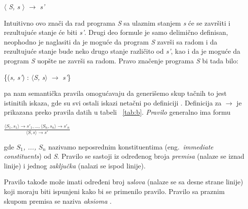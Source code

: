\documentclass[a4paper]{article}
\begin{document}
{\begin{center}$\langle$ \textit{S, s} $\rangle$ $\rightarrow$ \textit{s'} \end{center}
Intuitivno ovo znači da rad programa \textit{S} sa ulaznim stanjem \textit{s} će se završiti i rezultujuće stanje će biti \textit{s'}. Drugi deo formule je samo delimično definisan, neophodno je naglasiti da je moguće da program \textit{S} završi sa radom i da rezultujuće stanje bude neko drugo stanje različito od \textit{s'}, kao i da je moguće da program \textit{S} uopšte ne završi sa radom. Pravo značenje programa \textit{S} bi tada bilo:
\begin{center}\{(\textit{s, s'}) : $\langle$\textit{S, s}$\rangle$ $\rightarrow$ \textit{s'}\} \end{center} 
pa nam semantička pravila omogućavaju da generišemo skup tačnih to jest istinitih iskaza, gde su svi ostali iskazi netačni po definiciji \cite{wiley}.
Definicija za $\rightarrow$ je prikazana preko pravila datih u tabeli ~\ref{tab:b}. \textit{Pravilo} generalno ima formu

{\large \begin{center}$\frac{\langle S_1, s_1 \rangle \rightarrow s'_1, ... , \langle S_n, s_n \rangle \rightarrow s'_n}{\langle S, s \rangle \rightarrow s'}$ \end{center}}

gde \textit{$S_1$, ..., $S_n$} nazivamo neposrednim konstituentima (eng.~{\em immediate constituents}) od \textit{S}. Pravilo se sastoji iz određenog broja \textit{premisa} (nalaze se iznad linije) i jednog \textit{zaključka} (nalazi se ispod linije).

Pravilo takođe može imati određeni broj \textit{uslova} (nalaze se sa desne strane linije) koji moraju biti ispunjeni kako bi se primenilo pravilo. Pravilo sa praznim skupom premisa se naziva \textit{aksioma} \cite{wiley}.

}
\end{document}
